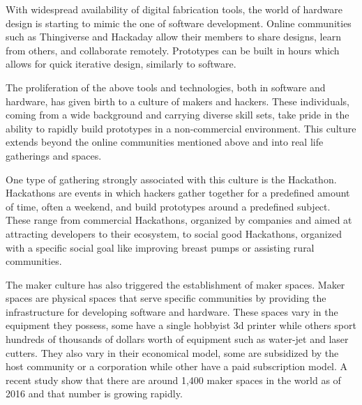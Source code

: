 With widespread availability of digital fabrication tools, the world of hardware design is starting to mimic the one of software development. Online communities such as Thingiverse\cite{thingverse} and Hackaday\cite{hackaday} allow their members to share designs, learn from others, and collaborate remotely. Prototypes can be built in hours which allows for quick iterative design, similarly to software. 

The proliferation of the above tools and technologies, both in software and hardware, has given birth to a culture of makers and hackers. These individuals, coming from a wide background and carrying diverse skill sets, take pride in the ability to rapidly build prototypes in a non-commercial environment. This culture extends beyond the online communities mentioned above and into real life gatherings and spaces. 

One type of gathering strongly associated with this culture is the Hackathon.  Hackathons are events in which hackers gather together for a predefined amount of time, often a weekend, and build prototypes around a predefined subject. These range from commercial Hackathons, organized by companies and aimed at attracting developers to their ecosystem, to social good Hackathons, organized with a specific social goal like improving breast pumps\cite{d2016feminist} or assisting rural communities\cite{hackforwestmass}.   

The maker culture has also triggered the establishment of maker spaces. Maker spaces are physical spaces that serve specific communities by providing the infrastructure for developing software and hardware. These spaces vary in the equipment they possess, some have a single hobbyist 3d printer while others sport hundreds of thousands of dollars worth of equipment such as water-jet and laser cutters. They also vary in their economical model, some are subsidized by the host community or a corporation while other have a paid subscription model. A recent study show that there are around 1,400 maker spaces in the world as of 2016 and that number is growing rapidly\cite{makersbynumbers}.

